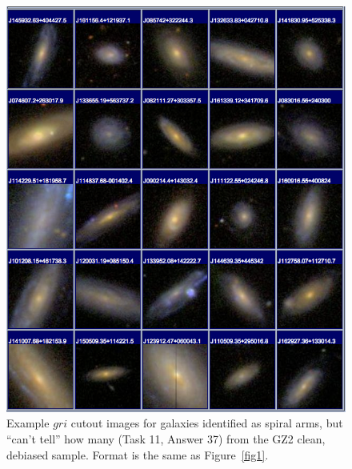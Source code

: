 \documentclass[useAMS,usenatbib]{mn2e}
\begin{document}
\newpage
\clearpage
\begin{figure}
\includegraphics[angle=0,width=7.0in]{figures/gallery/spiralcanttell.png}
\caption{Example $gri$ cutout images for galaxies identified as spiral arms, but ``can't tell'' how many (Task 11, Answer 37) from the GZ2 clean, debiased sample. Format is the same as Figure~\ref{fig1}.}
\end{figure}
\end{document}
